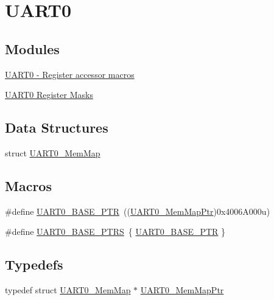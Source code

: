 \hypertarget{group___u_a_r_t0___peripheral}{}\section{U\+A\+R\+T0}
\label{group___u_a_r_t0___peripheral}
\subsection*{Modules}
\begin{DoxyCompactItemize}
\item 
\hyperlink{group___u_a_r_t0___register___accessor___macros}{U\+A\+R\+T0 -\/ Register accessor macros}
\item 
\hyperlink{group___u_a_r_t0___register___masks}{U\+A\+R\+T0 Register Masks}
\end{DoxyCompactItemize}
\subsection*{Data Structures}
\begin{DoxyCompactItemize}
\item 
struct \hyperlink{struct_u_a_r_t0___mem_map}{U\+A\+R\+T0\+\_\+\+Mem\+Map}
\end{DoxyCompactItemize}
\subsection*{Macros}
\begin{DoxyCompactItemize}
\item 
\#define \hyperlink{group___u_a_r_t0___peripheral_ga50a02c91ffbd11fa7b4f0c33fe585199}{U\+A\+R\+T0\+\_\+\+B\+A\+S\+E\+\_\+\+P\+T\+R}~((\hyperlink{group___u_a_r_t0___peripheral_gae795171499e041fb9b8f6ad5b97f896b}{U\+A\+R\+T0\+\_\+\+Mem\+Map\+Ptr})0x4006\+A000u)
\item 
\#define \hyperlink{group___u_a_r_t0___peripheral_ga9416d89d2bc04eb37311da5910f1c701}{U\+A\+R\+T0\+\_\+\+B\+A\+S\+E\+\_\+\+P\+T\+R\+S}~\{ \hyperlink{group___u_a_r_t0___peripheral_ga50a02c91ffbd11fa7b4f0c33fe585199}{U\+A\+R\+T0\+\_\+\+B\+A\+S\+E\+\_\+\+P\+T\+R} \}
\end{DoxyCompactItemize}
\subsection*{Typedefs}
\begin{DoxyCompactItemize}
\item 
typedef struct \hyperlink{struct_u_a_r_t0___mem_map}{U\+A\+R\+T0\+\_\+\+Mem\+Map} $\ast$ \hyperlink{group___u_a_r_t0___peripheral_gae795171499e041fb9b8f6ad5b97f896b}{U\+A\+R\+T0\+\_\+\+Mem\+Map\+Ptr}
\end{DoxyCompactItemize}


